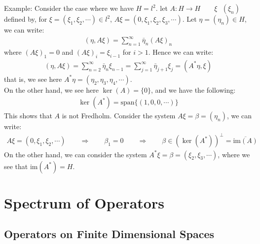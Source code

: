 \documentclass[11pt]{book}
\theoremstyle{break}
\theoremstyle{break}
\newcommand{\spa}{\text{span}}
\newcommand{\im}{\text{im}}
\newcommand{\example}{\color{green}Example: \color{black}}
\begin{document}
\example Consider the case where we have $H = l^2$. let $A:H \to H \qquad \xi	 \ \ \  (\xi_n)$ defined by, for $\xi=(\xi_1,\xi_2,\cdots) \in l^2$, $A\xi = (0,\xi_1,\xi_2,\xi_3,\cdots)$. Let $\eta = (\eta_n) \in H$, we can write:
\begin{align*}
(\eta, A\xi) = \sum_{n=1}^\infty \bar{\eta}_n(A\xi)_n 
\end{align*}
where $(A\xi)_1 = 0$ and $(A\xi)_i = \xi_{i-1}$ for $i>1$. Hence we can write:
\begin{align*}
(\eta, A\xi) = \sum_{n=2}^\infty \bar{\eta}_n \xi_{n-1} = \sum_{j=1}^\infty \bar{\eta}_{j+1}\xi_j = (A^* \eta, \xi)
\end{align*}
that is, we see here $A^*\eta = (\eta_2,\eta_3,\eta_4,\cdots)$. \\
On the other hand, we see here $\ker(A) = \{0\}$, and we have the following:
\begin{align*}
\ker(A^*) = \spa\{(1,0,0,\cdots)\}
\end{align*}
This shows that $A$ is not Fredholm. Consider the system $A\xi = \beta = (\eta_n)$, we can write:
\begin{align*}
A\xi = (0,\xi_1,\xi_2,\cdots) \qquad \Rightarrow \qquad \beta_1 = 0 \qquad \Rightarrow\qquad \beta \in (\ker(A^*))^\perp = \overline{\im(A)}
\end{align*}
On the other hand, we can consider the system $A^*\xi=\beta = (\xi_2,\xi_3,\cdots)$, where we see that $\im(A^*) 
= H $. \\





\newpage
\chapter{Spectrum of Operators}
\setcounter{section}{29}
\section[Operators on Finite Dimensional Spaces]{\color{red}Operators on Finite Dimensional Spaces\color{black}}
\end{document}
